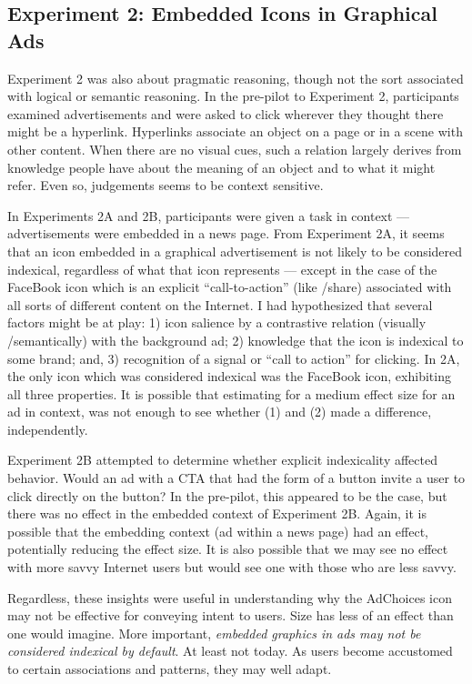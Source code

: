 \subsection{Experiment 2: Embedded Icons in Graphical Ads}
\label{experiment2:embeddediconsingraphicalads}

Experiment 2 was also about pragmatic reasoning, though not the sort associated with logical or semantic reasoning. In the pre-pilot to Experiment 2, participants examined advertisements and were asked to click wherever they thought there might be a hyperlink. Hyperlinks associate an object on a page or in a scene with other content. When there are no visual cues, such a relation largely derives from knowledge people have about the meaning of an object and to what it might refer. Even so, judgements seems to be context sensitive.

In Experiments 2A and 2B, participants were given a task in context --- advertisements were embedded in a news page. From Experiment 2A, it seems that an icon embedded in a graphical advertisement is not likely to be considered indexical, regardless of what that icon represents --- except in the case of the FaceBook icon which is an explicit ``call-to-action'' (like \slash  share) associated with all sorts of different content on the Internet. I had hypothesized that several factors might be at play: 1) icon salience by a contrastive relation (visually \slash  semantically) with the background ad; 2) knowledge that the icon is indexical to some brand; and, 3) recognition of a signal or ``call to action'' for clicking. In 2A, the only icon which was considered indexical was the FaceBook icon, exhibiting all three properties. It is possible that estimating for a medium effect size for an ad in context, was not enough to see whether (1) and (2) made a difference, independently.

Experiment 2B attempted to determine whether explicit indexicality affected behavior. Would an ad with a CTA that had the form of a button invite a user to click directly on the button? In the pre-pilot, this appeared to be the case, but there was no effect in the embedded context of Experiment 2B. Again, it is possible that the embedding context (ad within a news page) had an effect, potentially reducing the effect size. It is also possible that we may see no effect with more savvy Internet users but would see one with those who are less savvy.

Regardless, these insights were useful in understanding why the AdChoices icon may not be effective for conveying intent to users. Size has less of an effect than one would imagine. More important, \emph{embedded graphics in ads may not be considered indexical by default}. At least not today. As users become accustomed to certain associations and patterns, they may well adapt.

